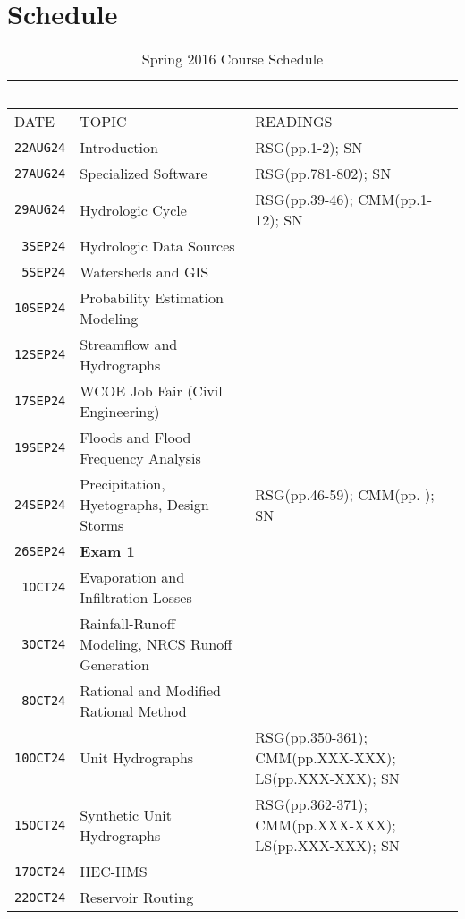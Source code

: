 \documentclass[12pt]{article}
\begin{document}
\section*{Schedule}
\begin{table}[ht!]
   \centering
   \caption{Spring 2016 Course Schedule}
   \begin{tabular}{p{0.5in}p{2.5in}p{3.0in}} 
   ~ & ~ & ~  \\
\hline
\hline
DATE & TOPIC & READINGS  \\
\hline
\texttt{22AUG24} & Introduction & RSG(pp.1-2); SN  \\ %
\texttt{27AUG24} & Specialized Software & RSG(pp.781-802); SN \\ %
\texttt{29AUG24} & Hydrologic Cycle  & RSG(pp.39-46); CMM(pp.1-12); SN \\ %
\texttt{~3SEP24} & Hydrologic Data Sources &\\ %
\texttt{~5SEP24} & Watersheds and GIS &  \\ %
\texttt{10SEP24} & Probability Estimation Modeling &  \\ %
\texttt{12SEP24} & Streamflow and Hydrographs &  \\ %
\texttt{17SEP24} & WCOE Job Fair (Civil Engineering)   &   \\ %
\texttt{19SEP24} & Floods and Flood Frequency Analysis &  \\ %
\texttt{24SEP24} & Precipitation, Hyetographs, Design Storms &  RSG(pp.46-59); CMM(pp. ); SN \\  %
\texttt{26SEP24} & \textbf{Exam 1} &  \\ %
\texttt{~1OCT24} & Evaporation and Infiltration Losses &  \\ %
\texttt{~3OCT24} & Rainfall-Runoff Modeling, NRCS Runoff Generation &  \\ %
\texttt{~8OCT24} & Rational and Modified Rational Method &  \\  %
\texttt{10OCT24} & Unit Hydrographs & RSG(pp.350-361); CMM(pp.XXX-XXX); LS(pp.XXX-XXX); SN\\ %
\texttt{15OCT24} & Synthetic Unit Hydrographs &  RSG(pp.362-371); CMM(pp.XXX-XXX); LS(pp.XXX-XXX); SN  \\ %
\texttt{17OCT24} & HEC-HMS  & \\ %
\texttt{22OCT24} & Reservoir Routing &   \\ %

\end{tabular}
\end{table}
\end{document}
